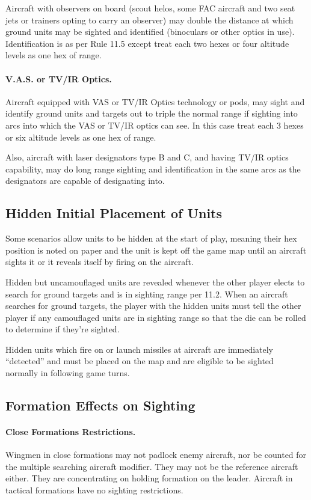 Aircraft with observers on board (scout helos, some FAC aircraft and two seat jets or trainers opting to carry an observer) may double the distance at which ground units may be sighted and identified (binoculars or other optics in use).  Identification is as per Rule 11.5 except treat each two hexes or four altitude levels as one hex of range.

\paragraph{V.A.S. or TV/IR Optics.} Aircraft equipped with VAS or TV/IR Optics technology or pods, may sight and identify ground units and targets out to triple the normal range if sighting into arcs into which the VAS or TV/IR optics can see. In this case treat each 3 hexes or six altitude levels as one hex of range.

Also, aircraft with laser designators type B and C, and having TV/IR optics capability, may do long range sighting and identification in the same arcs as the designators are capable of designating into.

\subsection{Hidden Initial Placement of Units}

Some scenarios allow units to be hidden at the start of play, meaning their hex position is noted on paper and the unit is kept off the game map until an aircraft sights it or it reveals itself by firing on the aircraft.

Hidden but uncamouflaged units are revealed whenever the other player elects to search for ground targets and is in sighting range per 11.2. When an aircraft searches for ground targets, the player with the hidden units must tell the other player if any camouflaged units are in sighting range so that the die can be rolled to determine if they're sighted.

Hidden units which fire on or launch missiles at aircraft are immediately “detected” and must be placed on the map and are eligible to be sighted normally in following game turns.

\subsection{Formation Effects on Sighting}

\paragraph{Close Formations Restrictions.} Wingmen in close formations may not padlock enemy aircraft, nor be counted for the multiple searching aircraft modifier. They may not be the reference aircraft either. They are concentrating on holding formation on the leader. Aircraft in tactical formations have no sighting restrictions.


